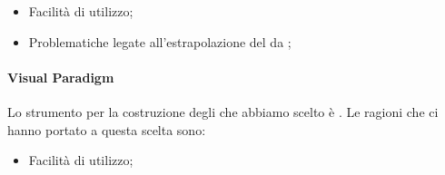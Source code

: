 \begin{itemize}
\item Facilità di utilizzo;
\item Problematiche legate all'estrapolazione del  da ;
\end{itemize}

\paragraph{Visual Paradigm}
Lo strumento per la costruzione degli  che abbiamo scelto è .
Le ragioni che ci hanno portato a questa scelta sono:
\begin{itemize}
\item Facilità di utilizzo;
\end{itemize}
\newpage 